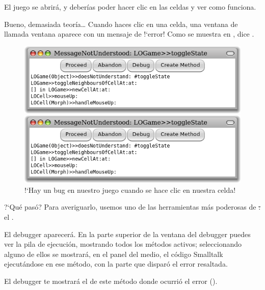 \documentclass[a4paper,10pt,twoside]{book}
\begin{document}
El juego se abrir\'a, y deber\'ias poder hacer clic en las celdas y ver como funciona. 

Bueno, demasiada teor\'ia\ldots{}
Cuando haces clic en una celda, una ventana de  llamada ventana  aparece con un mensaje de !`error!
Como se muestra en , dice .

\begin{figure}[ht]
\ifluluelse
	{\centerline{\includegraphics[width=\textwidth]{Error}}}
	{\centerline{\includegraphics[scale=0.7]{Error}}}
\caption{!`Hay un bug en nuestro juego cuando se hace clic en nuestra celda!
}
\end{figure}

\noindent
?`Qu\'e pas\'o? Para averiguarlo, usemos uno de las herramientas m\'as poderosas de \st: el .

El debugger aparecer\'a.
En la parte superior de la ventana del debugger puedes ver la pila de ejecuci\'on, mostrando todos los m\'etodos activos; seleccionando alguno de ellos se mostrar\'a, en el panel del medio, el c\'odigo Smalltalk ejecut\'andose en ese m\'etodo, con la parte que dispar\'o el error resaltada. 

El debugger te mostrar\'a el  de este m\'etodo donde ocurri\'o el error ().
\end{document}
